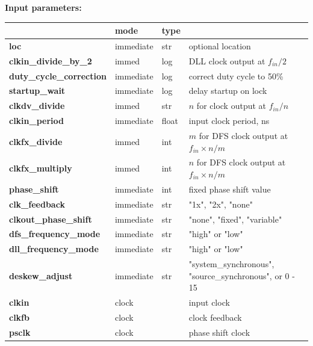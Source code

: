             {\bf Input parameters:} \\            
            \begin{tabular}{| l | l | l | l |}
            \hline
                           & mode  & type   & \\
            \hline \hline
            {\bf loc}                     & immediate & str   & optional location \\ \hline
            {\bf clkin\_divide\_by\_2}    & immed     & log   & DLL clock output at $f_{in}/2$ \\ \hline
            {\bf duty\_cycle\_correction} & immediate & log   & correct duty cycle to 50\%  \\ \hline
            {\bf startup\_wait}           & immediate & log   & delay startup on lock \\ \hline
            {\bf clkdv\_divide}           & immed     & str   & $n$ for clock output at $f_{in}/n$ \\ \hline
            {\bf clkin\_period}           & immediate & float & input clock period, ns \\ \hline
            {\bf clkfx\_divide}           & immed     & int   & $m$ for DFS clock output at $f_{in} \times n / m$ \\ \hline
            {\bf clkfx\_multiply}         & immed     & int   & $n$ for DFS clock output at $f_{in} \times n / m$ \\ \hline
            {\bf phase\_shift}            & immediate & int   & fixed phase shift value \\ \hline
            {\bf clk\_feedback}           & immediate & str   & "1x", "2x", "none" \\ \hline
            {\bf clkout\_phase\_shift}    & immediate & str   & "none", "fixed", "variable" \\ \hline
            {\bf dfs\_frequency\_mode}    & immediate & str   & "high" or "low" \\ \hline
            {\bf dll\_frequency\_mode}    & immediate & str   & "high" or "low" \\ \hline
            {\bf deskew\_adjust}          & immediate & str   & "system\_synchronous", "source\_synchronous", or 0 - 15 \\ \hline
            {\bf clkin}                   & clock     &       & input clock \\ \hline
            {\bf clkfb}                   & clock     &       & clock feedback \\ \hline
            {\bf psclk}                   & clock     &       & phase shift clock\\ \hline

\end{tabular}
